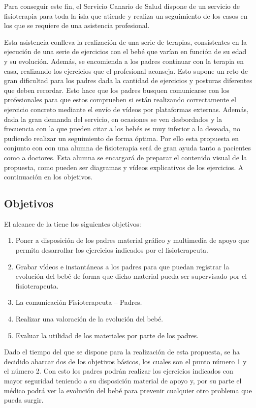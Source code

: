 Para conseguir este fin, el Servicio Canario de Salud dispone de un servicio de fisioterapia
para toda la isla que atiende y realiza un seguimiento de los casos en los que se requiere de
una asistencia profesional.

Esta asistencia conlleva la realización de una serie de terapias, consistentes en
la ejecución de una serie de ejercicios con el bebé que varían en función de su edad y su
evolución. Además, se encomienda a los padres continuar con la terapia en casa, realizando
los ejercicios que el profesional aconseja. Esto supone un reto de gran dificultad para los
padres dada la cantidad de ejercicios y posturas diferentes que deben recordar. Esto hace que
los padres busquen comunicarse con los profesionales para que estos comprueben si están
realizando correctamente el ejercicio concreto mediante el envío de vídeos por plataformas
externas. Además, dada la gran demanda del servicio, en ocasiones se ven desbordados y la
frecuencia con la que pueden citar a los bebés es muy inferior a la deseada, no pudiendo
realizar un seguimiento de forma óptima. Por ello esta propuesta en conjunto
con con una alumna de fisioterapia será de gran ayuda tanto
a pacientes como a doctores. Esta alumna se encargará de preparar el
contenido visual de la propuesta, como pueden ser diagramas y vídeos
explicativos de los ejercicios. A continuación en los objetivos.

\bigskip
\subsection{Objetivos}
El alcance de la \textbf{\myTitle} tiene los siguientes objetivos:
\begin{enumerate}
    \item Poner a disposición de los padres material gráfico y multimedia de apoyo que permita desarrollar los ejercicios indicados por el fisioterapeuta.
    \item Grabar vídeos e instantáneas a los padres para que puedan registrar la evolución del bebé de forma que dicho material pueda ser supervisado por el fisioterapeuta.
    \item La comunicación Fisioterapeuta – Padres.
    \item Realizar una valoración de la evolución del bebé.
    \item Evaluar la utilidad de los materiales por parte de los padres.
\end{enumerate}

Dado el tiempo del que se dispone para la realización de esta propuesta, se ha decidido abarcar
dos de los objetivos básicos, los cuales son el punto número 1 y el número 2. Con esto los padres
podrán realizar los ejercicios indicados con mayor seguridad teniendo a su disposición material
de apoyo y, por su parte el médico podrá ver la evolución del bebé para prevenir cualquier otro
problema que pueda surgir.